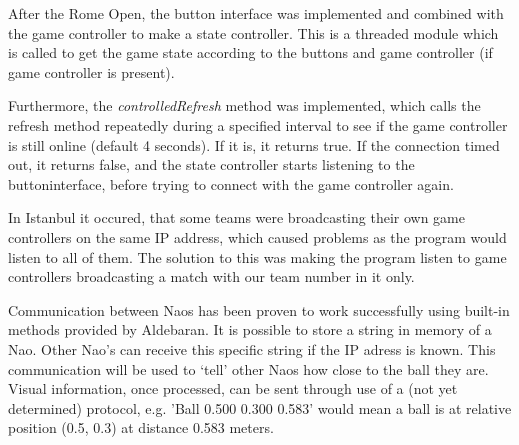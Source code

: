 \documentclass[11pt,a4paper,oneside]{article}
\begin{document}
After the Rome Open, the button interface was implemented and combined with the game controller to make a state controller. This is a threaded module which is called to get the game state according to the buttons and game controller (if game controller is present).

Furthermore, the \textit{controlledRefresh} method was implemented, which calls the refresh method repeatedly during a specified interval to see if the game controller is still online (default 4 seconds). If it is, it returns true. If the connection timed out, it returns false, and the state controller starts listening to the buttoninterface, before trying to connect with the game controller again.

In Istanbul it occured, that some teams were broadcasting their own game controllers on the same IP address, which caused problems as the program would listen to all of them. The solution to this was making the program listen to game controllers broadcasting a match with our team number in it only.  

Communication between Naos has been proven to work successfully using built-in methods provided by Aldebaran. It is possible to store a string in memory of a Nao. Other Nao's can receive this specific string if the IP adress is known. This communication will be used to `tell' other Naos how close to the ball they are. Visual information, once processed, can be sent through use of a (not yet determined) protocol, e.g. 'Ball 0.500 0.300 0.583' would mean a ball is at relative position (0.5, 0.3) at distance 0.583 meters.
\end{document}
